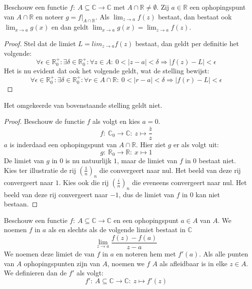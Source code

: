 \documentclass[main.tex]{subfiles}
\begin{document}

\begin{bpr}
  \label{pr:limiet-in-c-dan-beperking-limiet-in-r}
  Beschouw een functie $f:\ A \subseteq \mathbb{C} \rightarrow \mathbb{C}$ met $A \cap \mathbb{R} \neq \emptyset$.
  Zij $a \in \mathbb{R}$ een ophopingspunt van $A \cap \mathbb{R}$ en noteer $g=f|_{A \cap \mathbb{R}}$.
  Als $\lim_{z\rightarrow a}f(z)$ bestaat, dan bestaat ook $\lim_{x \rightarrow a}g(x)$ en dan geldt $\lim_{x \rightarrow a}g(x) = \lim_{z \rightarrow a}f(z)$.

  \begin{proof}
    Stel dat de limiet $L = lim_{z\rightarrow a}f(z)$ bestaat, dan geldt per definitie het volgende:
    \[ \forall \epsilon \in \mathbb{R}_{0}^{+}: \exists \delta \in \mathbb{R}_{0}^{+}: \forall z\in A:\ 0 < |z-a| < \delta \Rightarrow |f(z) - L| < \epsilon \]
    Het is nu evident dat ook het volgende geldt, wat de stelling bewijst:
    \[ \forall \epsilon \in \mathbb{R}_{0}^{+}: \exists \delta \in \mathbb{R}_{0}^{+}: \forall r\in A\cap \mathbb{R}:\ 0 < |r-a| < \delta \Rightarrow |f(r) - L| < \epsilon \]
  \end{proof}
\end{bpr}

\begin{tvb}
  \label{tvb:limiet-in-c-dan-beperking-limiet-in-r}
  Het omgekeerde van bovenstaande stelling geldt niet.

  \begin{proof}
    Beschouw de functie $f$ als volgt en kies $a=0$.
    \[ f:\ \mathbb{C}_{0} \rightarrow \mathbb{C}:\ z \mapsto \frac{\overline{z}}{z} \]
    $a$ is inderdaad een ophopingspunt van $A\cap \mathbb{R}$.
    Hier ziet $g$ er als volgt uit:
    \[ g:\ \mathbb{R}_{0} \rightarrow \mathbb{R}:\ x \mapsto 1 \]
    De limiet van $g$ in $0$ is nu natuurlijk $1$, maar de limiet van $f$ in $0$ bestaat niet.
    Kies ter illustratie de rij $\left(\frac{1}{n}\right)_{n}$ die convergeert naar nul.
    Het beeld van deze rij convergeert naar $1$.
    Kies ook die rij $\left(\frac{i}{n}\right)_{n}$ die eveneens convergeert naar nul.
    Het beeld van deze rij convergeert naar $-1$, dus de limiet van $f$ in $0$ kan niet bestaan.
  \end{proof}
\end{tvb}

\begin{de}
  Beschouw een functie $f:\ A \subseteq \mathbb{C} \rightarrow \mathbb{C}$ en een ophopingspunt $a\in A$ van $A$.
  We noemen $f$  in $a$ als en slechts als de volgende limiet bestaat in $\mathbb{C}$
  \[ \lim_{z \rightarrow a}\frac{f(z)-f(a)}{z-a} \]
  We noemen deze limiet de  van $f$ in $a$ en noteren hem met $f'(a)$.
  Als alle punten van $A$ ophopingspunten zijn van $A$, noemen we $f$  $A$ als afleidbaar is in elke $z \in A$.
  We definieren dan de  $f'$ als volgt:
  \[ f':\ A \subseteq \mathbb{C} \rightarrow \mathbb{C}:\ z \mapsto f'(z) \]
\end{de}
\end{document}
